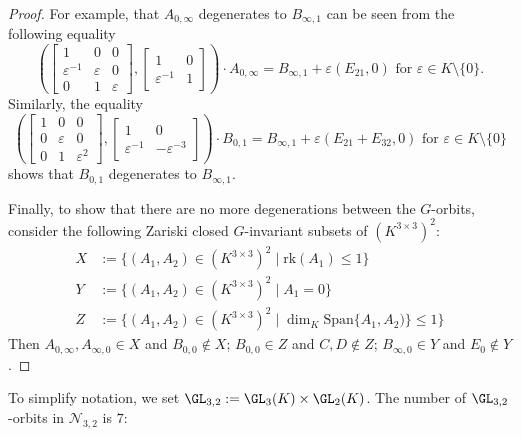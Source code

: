 \documentclass[12pt]{amsart}
\newcommand{\field}{K}
\newcommand{\rank}{\mathrm{rk}}
\begin{document}
\begin{proof}
For example, that $A_{0,\infty}$ degenerates to $B_{\infty,1}$ can be seen from 
the following equality 
\[\left(\begin{bmatrix}1&0&0\\ \varepsilon^{-1}&\varepsilon&0\\0&1&\varepsilon\end{bmatrix}, 
\begin{bmatrix}1&0\\ \varepsilon^{-1}&1\end{bmatrix}\right)
\cdot A_{0,\infty}=B_{\infty,1}+\varepsilon(E_{21},0)\text{ for }\varepsilon\in \field\setminus\{0\}. \]
Similarly, the equality 
\[\left(\begin{bmatrix}1&0&0\\0& \varepsilon&0 \\0&1&\varepsilon^2\end{bmatrix},
\begin{bmatrix} 1&0\\ \varepsilon^{-1}&-\varepsilon^{-3}\end{bmatrix}\right)
\cdot B_{0,1}=B_{\infty,1}+\varepsilon(E_{21}+E_{32},0) \text{ for }\varepsilon\in\field\setminus\{0\}\]
shows that $B_{0,1}$ degenerates to $B_{\infty,1}$. 

Finally, to show that there are no more degenerations between the $G$-orbits, 
consider the following Zariski closed $G$-invariant subsets of 
$(\field^{3\times 3})^2$: 
\begin{align*}X&:=\{(A_1,A_2)\in (\field^{3\times 3})^2\mid \rank(A_1)\le 1\} \\
Y&:=\{(A_1,A_2)\in (\field^{3\times 3})^2\mid A_1=0\} \\
Z&:= \{(A_1,A_2)\in (\field^{3\times 3})^2\mid \dim_\field \mathrm{Span}\{A_1,A_2)\}\le 1\}
\end{align*} 
Then $A_{0,\infty}, A_{\infty,0}\in X$ and $B_{0,0}\notin X$; 
$B_{0,0}\in Z$ and $C,D\notin Z$; 
$B_{\infty,0}\in Y$ and $E_0\notin Y$. 
\end{proof}
 
To simplify notation, we set 
$\GL_{3,2}:=\GL_3(\field)\times\GL_2(\field)$. 
The number of $\GL_{3,2}$-orbits in $\mathcal{N}_{3,2}$  is $7$: 
\end{document}

